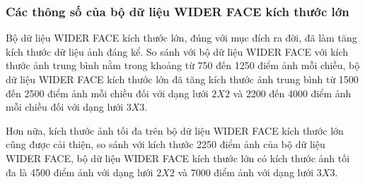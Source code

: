 {    \subsubsection*{Các thông số của bộ dữ liệu WIDER FACE kích thước lớn}
    Bộ dữ liệu WIDER FACE kích thước lớn, đúng với mục đích ra đời, đã làm tăng kích thước dữ liệu ảnh đáng kể.
    So sánh với bộ dữ liệu WIDER FACE với kích thước ảnh trung bình nằm trong khoảng từ 750 đến 1250 điểm ảnh mỗi chiều, bộ dữ liệu WIDER FACE kích thước lớn đã tăng kích thước ảnh trung bình từ 1500 đến 2500 điểm ảnh mỗi chiều đối với dạng lưới $2 X 2$ và 2200 đến 4000 điểm ảnh mỗi chiều đối với dạng lưới $3 X 3$.

    \noindent
    Hơn nữa, kích thước ảnh tối đa trên bộ dữ liệu WIDER FACE kích thước lớn cũng được cải thiện, so sánh với kích thước 2250 điểm ảnh của bộ dữ liệu WIDER FACE, bộ dữ liệu WIDER FACE kích thước lớn có kích thước ảnh tối đa là 4500 điểm ảnh với dạng lưới $2 X 2$ và 7000 điểm ảnh với dạng lưới $3 X 3$.

}
